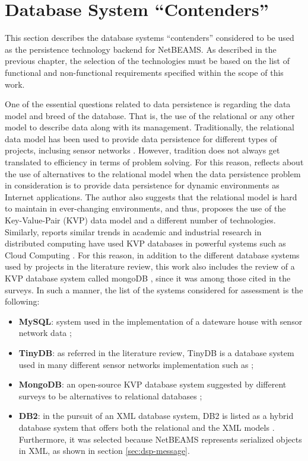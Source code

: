 \section{Database System ``Contenders''}

This section describes the database systems ``contenders'' considered to be used
as the persistence technology backend for NetBEAMS. As described in the
previous chapter, the selection of the technologies must be based on the list
of functional and non-functional requirements specified within the scope of
this work.

One of the essential questions related to data persistence is regarding the
data model and breed of the database. That is, the use of the relational or
any other model to describe data along with its management. Traditionally, the
relational data model has been used to provide data persistence for different
types of projects, inclusing sensor networks \cite{sn-dataware-house,
db-xml-enabled, sn-db-tinydb}. However, tradition does not always get translated
to efficiency in terms of problem solving. For this reason,
\cite{db-is-rdbs-dommed} reflects about the use of alternatives to the
relational model when the data persistence problem in consideration is to
provide data persistence for dynamic environments as Internet applications. The
author also suggests that the relational model is hard to maintain in
ever-changing environments, and thus, proposes the use of the Key-Value-Pair
(KVP) data model and a different number of technologies. Similarly,
\cite{cloud-comp-survey} reports similar trends in academic and industrial
research in distributed computing have used KVP databases in powerful systems
such as Cloud Computing \cite{cloud-comp-architectures}. For this reason, in
addition to the different database systems used by projects in the
literature review, this work also includes the review of a KVP database system
called mongoDB \cite{mongodb}, since it was among those cited in the surveys.
In such a manner, the list of the systems considered for assessment is the
following:

\begin{itemize}
  \item \textbf{MySQL}\cite{mysql}: system used in the implementation of a
  dateware house with sensor network data \cite{sn-dataware-house};
  \item \textbf{TinyDB}\cite{tinydb}: as referred in the literature review,
  TinyDB is a database system used in many different sensor networks
  implementation such as \cite{sn-db-tinydb};
  \item \textbf{MongoDB}\cite{mongodb}: an open-source KVP database
  system suggested by different surveys to be alternatives to relational
  databases \cite{db-is-rdbs-dommed, cloud-comp-architectures};
  \item \textbf{DB2}\cite{db2}: in the pursuit of an XML database system, DB2
  is listed as a hybrid database system that offers both the relational and the
  XML models \cite{db-xml-enabled}. Furthermore, it was selected because
  NetBEAMS represents serialized objects in XML, as shown in section
  \ref{sec:dsp-message}.
\end{itemize}

